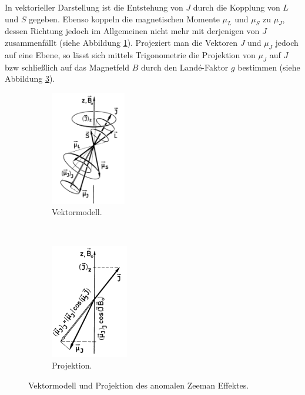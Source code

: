 	In vektorieller Darstellung ist die Entstehung von $J$ durch die Kopplung von $L$ und $S$ gegeben. Ebenso koppeln die magnetischen Momente $\mu_L$ und $\mu_S$ zu $\mu_J$, dessen Richtung jedoch im Allgemeinen nicht mehr mit derjenigen von $J$ zusammenfällt (siehe Abbildung \ref{fig:VektormodellAnomalZeeman}). Projeziert man die Vektoren $J$ und $\mu_J$ jedoch auf eine Ebene, so lässt sich mittels Trigonometrie die Projektion von $\mu_J$ auf $J$ bzw schließlich auf das Magnetfeld $B$ durch den Landé-Faktor $g$ bestimmen (siehe Abbildung \ref{fig:ProjektionVektormodellAnomalerZeeman}).
	\begin{figure}[H]
		\centering
		\begin{subfigure}[b]{0.4\textwidth}
			\centering
			\includegraphics[height=5cm]{Bilddateien/Grundlagen/VektormodellAnomalZeeman.png}
			\caption{Vektormodell.}
			\label{fig:VektormodellAnomalZeeman}
		\end{subfigure}
		\
		\begin{subfigure}[b]{0.4\textwidth}
			\centering
			\includegraphics[height=5cm]{Bilddateien/Grundlagen/ProjektionVektormodellAnomalerZeeman.png}
			\caption{Projektion.}
			\label{fig:ProjektionVektormodellAnomalerZeeman}
		\end{subfigure}
		\caption{Vektormodell und Projektion des anomalen Zeeman Effektes.}
	\end{figure}

